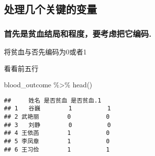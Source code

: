 \documentclass[
]{article}
\newenvironment{Shaded}{\begin{snugshade}}{\end{snugshade}}
\newcommand{\DecValTok}[1]{\textcolor[rgb]{0.00,0.00,0.81}{#1}}
\newcommand{\FloatTok}[1]{\textcolor[rgb]{0.00,0.00,0.81}{#1}}
\newcommand{\FunctionTok}[1]{\textcolor[rgb]{0.00,0.00,0.00}{#1}}
\newcommand{\NormalTok}[1]{#1}
\newcommand{\OtherTok}[1]{\textcolor[rgb]{0.56,0.35,0.01}{#1}}
\newcommand{\SpecialCharTok}[1]{\textcolor[rgb]{0.00,0.00,0.00}{#1}}
\newcommand{\StringTok}[1]{\textcolor[rgb]{0.31,0.60,0.02}{#1}}
\begin{document}
\hypertarget{ux5904ux7406ux51e0ux4e2aux5173ux952eux7684ux53d8ux91cf}{%
\subsection{处理几个关键的变量}\label{ux5904ux7406ux51e0ux4e2aux5173ux952eux7684ux53d8ux91cf}}

\hypertarget{ux9996ux5148ux662fux8d2bux8840ux7ed3ux5c40ux548cux7a0bux5ea6ux8981ux8003ux8651ux628aux5b83ux7f16ux7801.}{%
\subsubsection{首先是贫血结局和程度，要考虑把它编码.}\label{ux9996ux5148ux662fux8d2bux8840ux7ed3ux5c40ux548cux7a0bux5ea6ux8981ux8003ux8651ux628aux5b83ux7f16ux7801.}}

将贫血与否先编码为0或者1

\begin{Shaded}
\end{Shaded}

看看前五行

\begin{Shaded}
\begin{Highlighting}[]
\NormalTok{blood\_outcome }\SpecialCharTok{\%\textgreater{}\%} \FunctionTok{head}\NormalTok{()}
\end{Highlighting}
\end{Shaded}

\begin{verbatim}
##     姓名 是否贫血 是否贫血.1
## 1   谷巍        1          1
## 2 武艳丽        0          0
## 3   刘静        0          0
## 4 王依菡        1          0
## 5 李凤章        1          0
## 6 王习俭        1          1
\end{verbatim}
\end{document}
